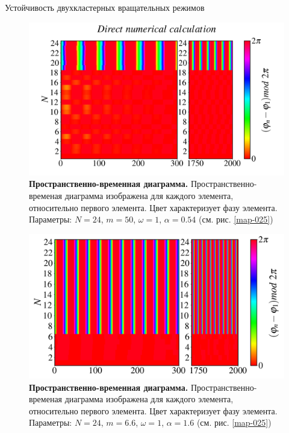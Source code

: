 \begin{chapter}{Устойчивость двухкластерных вращательных режимов}
	\begin{figure}[h!]
		\begin{center}
			\includegraphics[width=1\columnwidth]{pictures/Figure_M_50_A_0.54_O_1.png}
		\end{center}
		\caption{\textbf{Пространственно-временная диаграмма.}
		Пространственно-временая диаграмма изображена для каждого элемента, относительно первого элемента.
		Цвет характеризует фазу элемента. Параметры: $N=24$, $m = 50$, $\omega = 1$, $\alpha = 0.54$ (см. рис. \ref{map-025})}
		\label{st-c-3}
	\end{figure}

	\begin{figure}[h!]
		\begin{center}
			\includegraphics[width=1\columnwidth]{pictures/Figure_d.png}
		\end{center}
		\caption{\textbf{Пространственно-временная диаграмма.}
		Пространственно-временая диаграмма изображена для каждого элемента, относительно первого элемента.
		Цвет характеризует фазу элемента. Параметры: $N=24$, $m = 6.6$, $\omega = 1$, $\alpha = 1.6$ (см. рис. \ref{map-025})}
		\label{st-c-4}
	\end{figure}


\end{chapter}
